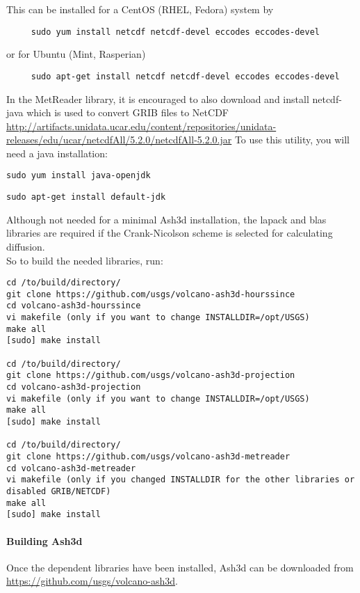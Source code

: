 This can be installed for a CentOS (RHEL, Fedora) system by
\begin{verbatim}
     sudo yum install netcdf netcdf-devel eccodes eccodes-devel
\end{verbatim}
or for Ubuntu (Mint, Rasperian)
\begin{verbatim}
     sudo apt-get install netcdf netcdf-devel eccodes eccodes-devel
\end{verbatim}

In the MetReader library, it is encouraged to also download and install 
netcdf-java which is used to convert GRIB files to NetCDF
\url{http://artifacts.unidata.ucar.edu/content/repositories/unidata-releases/edu/ucar/netcdfAll/5.2.0/netcdfAll-5.2.0.jar}
To use this utility, you will need a java installation:
\begin{verbatim}
sudo yum install java-openjdk
\end{verbatim}
\begin{verbatim}
sudo apt-get install default-jdk
\end{verbatim}

Although not needed for a minimal Ash3d installation, the lapack and blas
libraries are required if the Crank-Nicolson scheme is selected for calculating
diffusion.\\

So to build the needed libraries, run:
\begin{verbatim}
cd /to/build/directory/
git clone https://github.com/usgs/volcano-ash3d-hourssince
cd volcano-ash3d-hourssince
vi makefile (only if you want to change INSTALLDIR=/opt/USGS)
make all
[sudo] make install

cd /to/build/directory/
git clone https://github.com/usgs/volcano-ash3d-projection
cd volcano-ash3d-projection
vi makefile (only if you want to change INSTALLDIR=/opt/USGS)
make all
[sudo] make install

cd /to/build/directory/
git clone https://github.com/usgs/volcano-ash3d-metreader
cd volcano-ash3d-metreader
vi makefile (only if you changed INSTALLDIR for the other libraries or disabled GRIB/NETCDF)
make all
[sudo] make install
\end{verbatim}

\paragraph{Building Ash3d}
Once the dependent libraries have been installed, Ash3d can be downloaded from
\url{https://github.com/usgs/volcano-ash3d}.

